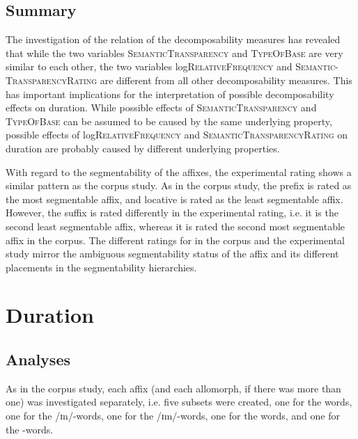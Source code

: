 \subsection{Summary}

The investigation of the relation of the decomposability measures has revealed that while the two variables \textsc{SemanticTransparency} and \textsc{TypeOfBase} are very similar to each other, the two variables log\textsc{RelativeFrequency} and \textsc{Semantic-TransparencyRating} are different from all other decomposability measures.
This has important implications for the interpretation of possible decomposability effects on duration. While possible effects of \textsc{SemanticTransparency} and \textsc{TypeOfBase} can be assumed to be caused by the same underlying property, possible effects of log\textsc{RelativeFrequency} and \textsc{SemanticTransparencyRating} on duration are probably caused by different underlying properties.



With regard to the segmentability of the affixes, the experimental rating shows a similar pattern as the corpus study. As in the corpus study, the prefix  is rated as the most segmentable affix, and locative  is rated as the least segmentable affix. However, the suffix  is rated differently in the experimental rating, i.e. it is the second least segmentable affix, whereas it is rated the second most segmentable affix in the corpus. The different ratings for  in the corpus and the experimental study mirror the ambiguous segmentability status of the affix and its different placements in the segmentability hierarchies. 



\section{Duration}


\subsection{Analyses} \label{analsyses duration experiment}

As in the corpus study, each affix (and each allomorph, if there was more than one) was investigated separately, i.e. five subsets were created, one for the  words, one for the /ɪn/-words, one for the /ɪm/-words, one for the words, and one for the -words.

